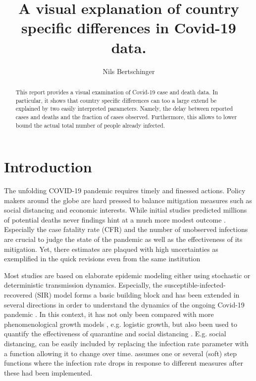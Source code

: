 \documentclass[fullpage,a4paper]{article}
\title{A visual explanation of country specific differences in
  Covid-19 data.}
\author{Nils Bertschinger}
\begin{document}
\maketitle%

\begin{abstract}
  This report provides a visual examination of Covid-19 case and death
  data. In particular, it shows that country specific differences can
  too a large extend be explained by two easily interpreted
  parameters. Namely, the delay between reported cases and deaths and
  the fraction of cases observed. Furthermore, this allows to lower
  bound the actual total number of people already infected.
\end{abstract}

\section{Introduction}

The unfolding COVID-19 pandemic requires timely and finessed
actions. Policy makers around the globe are hard pressed to balance
mitigation measures such as social distancing and economic
interests. While initial studies \cite{imperial1} predicted millions
of potential deaths never findings hint at a much more modest outcome
\cite{Lourenco2020.03.24.20042291,imperial2}. Especially the case
fatality rate (CFR) and the number of unobserved infections are
crucial to judge the state of the pandemic as well as the
effectiveness of its mitigation. Yet, there estimates are plaqued with
high uncertainties as exemplified in the quick revisions even from the
same institution \cite{imperial1,imperial2}

Most studies are based on elaborate epidemic modeling either using
stochastic or deterministic transmission dynamics. Especially, the
susceptible-infected-recovered (SIR) model \cite{Newman} forms a
basic building block and has been extended in several directions in
order to understand the dynamics of the ongoing Covid-19 pandemic
\cite{arxiv:2002.07572,arxiv:2004.01105,10.1126/science.abb3221,https://www.medrxiv.org/content/10.1101/2020.02.27.20028639v2}.
In this context, it has not only been compared with more
phenomenological growth models
\cite{https://doi.org/10.1101/2020.03.12.20034595}, e.g. logistic
growth, but also been used to quantify the effectiveness of quarantine
and social distancing \cite{arxiv:2002.07572,arxiv:2004.01105}.
E.g. social distancing, can be easily included by replacing the
infection rate parameter with a function allowing it to change over
time. \cite{arxiv:2004.01105} assumes one or several (soft) step
functions where the infection rate drops in response to different
measures after these had been implemented.
\end{document}
